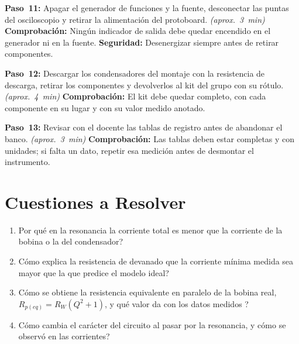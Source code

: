 \documentclass[12pt]{article}
\begin{document}
\begin{pasos}
  \item \textbf{Paso~11:} Apagar el generador de funciones y la fuente, desconectar las puntas del osciloscopio y retirar la alimentación del protoboard. \emph{(aprox.~\SI{3}{\minute})} \textbf{Comprobación:} Ningún indicador de salida debe quedar encendido en el generador ni en la fuente. \textbf{Seguridad:} Desenergizar siempre antes de retirar componentes.
  \item \textbf{Paso~12:} Descargar los condensadores del montaje con la resistencia de descarga, retirar los componentes y devolverlos al kit del grupo con su rótulo. \emph{(aprox.~\SI{4}{\minute})} \textbf{Comprobación:} El kit debe quedar completo, con cada componente en su lugar y con su valor medido anotado.
  \item \textbf{Paso~13:} Revisar con el docente las tablas de registro antes de abandonar el banco. \emph{(aprox.~\SI{3}{\minute})} \textbf{Comprobación:} Las tablas deben estar completas y con unidades; si falta un dato, repetir esa medición antes de desmontar el instrumento.
\end{pasos}

\section{Cuestiones a Resolver}\label{sec:cuestiones}
\begin{enumerate}
  \item \textquestiondown{}Por qué en la resonancia la corriente total es menor que la corriente de la bobina o la del condensador?
  \item \textquestiondown{}Cómo explica la resistencia de devanado que la corriente mínima medida sea mayor que la que predice el modelo ideal?
  \item \textquestiondown{}Cómo se obtiene la resistencia equivalente en paralelo de la bobina real, $R_{p(eq)} = R_W(Q^2 + 1)$, y qué valor da con los datos medidos \cite{ref1}?
  \item \textquestiondown{}Cómo cambia el carácter del circuito al pasar por la resonancia, y cómo se observó en las corrientes?
\end{enumerate}

\end{document}
